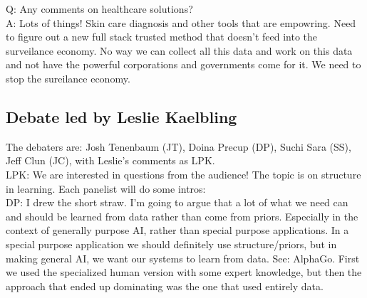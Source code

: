 Q: Any comments on healthcare solutions?  \\

A: Lots of things! Skin care diagnosis and other tools that are empowring. Need to figure out a new full stack trusted method that doesn't feed into the surveilance economy. No way we can collect all this data and work on this data and not have the powerful corporations and governments come for it. We need to stop the sureilance economy. 


\subsection{Debate led by Leslie Kaelbling}
\label{sec:debate}

The debaters are: Josh Tenenbaum (JT), Doina Precup (DP), Suchi Sara (SS), Jeff Clun (JC), with Leslie's comments as LPK. \\


LPK: We are interested in questions from the audience! The topic is on structure in learning. Each panelist will do some intros: \\

DP: I drew the short straw. I'm going to argue that a lot of what we need can and should be learned from data rather than come from priors. Especially in the context of generally purpose AI, rather than special purpose applications. In a special purpose application we should definitely use structure/priors, but in making general AI, we want our systems to learn from data. See: AlphaGo. First we used the specialized human version with some expert knowledge, but then the approach that ended up dominating was the one that used entirely data. \\

